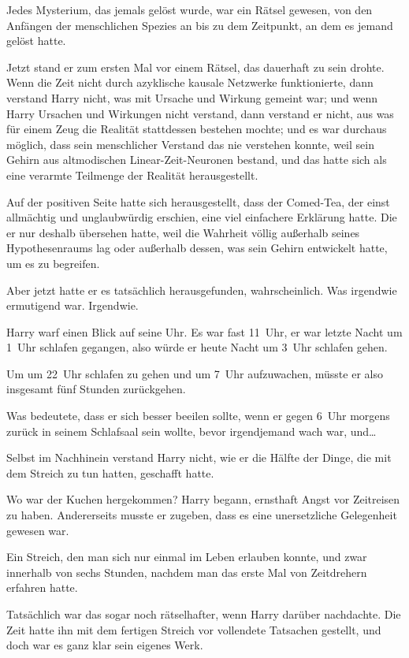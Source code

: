 {Jedes Mysterium, das jemals gelöst wurde, war ein Rätsel gewesen, von den Anfängen der menschlichen Spezies an bis zu dem Zeitpunkt, an dem es jemand gelöst hatte.

Jetzt stand er zum ersten Mal vor einem Rätsel, das dauerhaft zu sein drohte. Wenn die Zeit nicht durch azyklische kausale Netzwerke funktionierte, dann verstand Harry nicht, was mit Ursache und Wirkung gemeint war; und wenn Harry Ursachen und Wirkungen nicht verstand, dann verstand er nicht, aus was für einem Zeug die Realität stattdessen bestehen mochte; und es war durchaus möglich, dass sein menschlicher Verstand das nie verstehen konnte, weil sein Gehirn aus altmodischen Linear-Zeit-Neuronen bestand, und das hatte sich als eine verarmte Teilmenge der Realität herausgestellt.

Auf der positiven Seite hatte sich herausgestellt, dass der Comed-Tea, der einst allmächtig und unglaubwürdig erschien, eine viel einfachere Erklärung hatte. Die er nur deshalb übersehen hatte, weil die Wahrheit völlig außerhalb seines Hypothesenraums lag oder außerhalb dessen, was sein Gehirn entwickelt hatte, um es zu begreifen.

Aber jetzt hatte er es tatsächlich herausgefunden, wahrscheinlich. Was irgendwie ermutigend war. Irgendwie.

Harry warf einen Blick auf seine Uhr. Es war fast 11~Uhr, er war letzte Nacht um 1~Uhr schlafen gegangen, also würde er heute Nacht um 3~Uhr schlafen gehen.

Um um 22~Uhr schlafen zu gehen und um 7~Uhr aufzuwachen, müsste er also insgesamt fünf Stunden zurückgehen.

Was bedeutete, dass er sich besser beeilen sollte, wenn er gegen 6~Uhr morgens zurück in seinem Schlafsaal sein wollte, bevor irgendjemand wach war, und…

Selbst im Nachhinein verstand Harry nicht, wie er die Hälfte der Dinge, die mit dem Streich zu tun hatten, geschafft hatte.

Wo war der Kuchen hergekommen? Harry begann, ernsthaft Angst vor Zeitreisen zu haben. Andererseits musste er zugeben, dass es eine unersetzliche Gelegenheit gewesen war.

Ein Streich, den man sich nur einmal im Leben erlauben konnte, und zwar innerhalb von sechs Stunden, nachdem man das erste Mal von Zeitdrehern erfahren hatte.

Tatsächlich war das sogar noch rätselhafter, wenn Harry darüber nachdachte. Die Zeit hatte ihn mit dem fertigen Streich vor vollendete Tatsachen gestellt, und doch war es ganz klar sein eigenes Werk.

}
